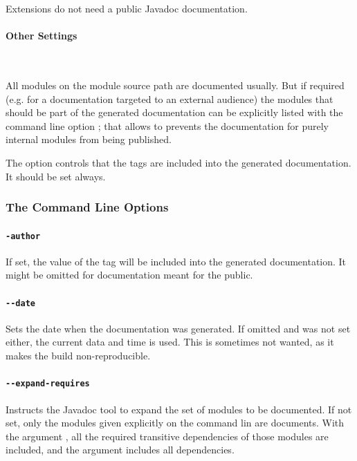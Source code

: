 \renewcommand{\cellalign}{tl}

Extensions do not need a public Javadoc documentation.

\paragraph{Other Settings}\

All modules on the module source path are documented usually. But if required (e.g. for a documentation targeted to an external audience) the modules that should be part of the generated documentation can be explicitly listed with the command line option \mbox{}; that allows to prevents the documentation for purely internal modules from being published.

The \mbox{} option controls that the  tags are included into the generated documentation. It should be set always.

\subsubsection{The Command Line Options}

\paragraph{\texttt{-author}} If set, the value of the  tag will be included into the generated documentation. It might be omitted for documentation meant for the public.

\paragraph{\texttt{-{}-date}} Sets the date when the documentation was generated. If omitted and  was not set either, the current data and time is used. This is sometimes not wanted, as it makes the build non-reproducible.

\paragraph{\texttt{-{}-expand-requires}} Instructs the Javadoc tool to expand the set of modules to be documented. If not set, only the modules given explicitly on the command lin are documents. With the argument , all the required transitive dependencies of those modules are included, and the argument  includes all dependencies. 

